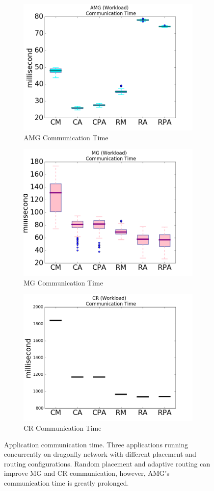 \documentclass[conference,compsoc]{IEEEtran}
\begin{document}
\begin{figure}[t!]
    \centering
    \begin{subfigure}[t]{0.32\textwidth}
        \centering
        \includegraphics[height=1.5 in]{amg/commtime}
        \caption{AMG Communication Time}
        \label{fig:amg-commtime}
    \end{subfigure}%
    \hspace{1em}%
    \begin{subfigure}[t]{0.32\textwidth}
        \centering
        \includegraphics[height=1.5 in]{mg/commtime}
        \caption{MG Communication Time}
        \label{fig:mg-commtime}
    \end{subfigure}%
    \begin{subfigure}[t]{0.32\textwidth}
        \centering
        \includegraphics[height=1.5 in]{cr/commtime}
        \caption{CR Communication Time}
        \label{fig:cr-commtime}
    \end{subfigure}%
   \caption{Application communication time. Three applications running concurrently on dragonfly network with different placement and routing configurations. Random placement and adaptive routing can improve MG and CR communication, however, AMG's communication time is greatly prolonged.}
   \label{fig:apps-commtime}
\end{figure}
\end{document}
